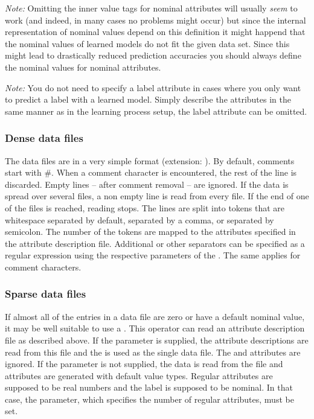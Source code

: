 {

\textit{Note:} Omitting the inner value tags for nominal attributes
will usually \textit{seem} to work (and indeed, in many cases no problems might
occur) but since the internal representation of nominal values depend on this
definition it might happend that the nominal values of learned models do not fit 
the given data set. Since this might lead to drastically reduced prediction accuracies
you should always define the nominal values for nominal attributes.

\textit{Note:} You do not need to specify a label
attribute in cases where you only want to predict a label with a learned
model. Simply describe the attributes in the same manner as in the learning
process setup, the label attribute can be omitted.


\subsubsection{Dense data files}
The data files are in a very simple format (extension: ). By default,
comments start with \#. When a comment character is encountered, the
rest of the line is discarded. Empty lines -- after comment removal
-- are ignored. If the data is spread over several files, a non empty
line is read from every file. If the end of one of the files is
reached, reading stops. The lines are split into tokens that are 
whitespace separated by default, separated by a comma, or separated by semicolon. The number of the tokens are mapped to
the  attributes specified in the attribute description
file. Additional or other separators can be specified as a regular expression
using the respective parameters of the . 
The same applies for comment characters.


\subsubsection{Sparse data files}
\label{sec:sparse_format}
If almost all of the entries in a data file are zero or have a default nominal
value, it may be well suitable to use a . This
operator can read an attribute description file as described above. If the
 parameter is supplied, the attribute
descriptions are read from this file and the  is used as
the single data file. The  and  attributes are
ignored. If the  parameter is not supplied,
the data is read from the file  and attributes are generated
with default value types. Regular attributes are supposed to be real numbers
and the label is supposed to be nominal. In that case, the 
parameter, which specifies the number of regular attributes, must be set.

}
